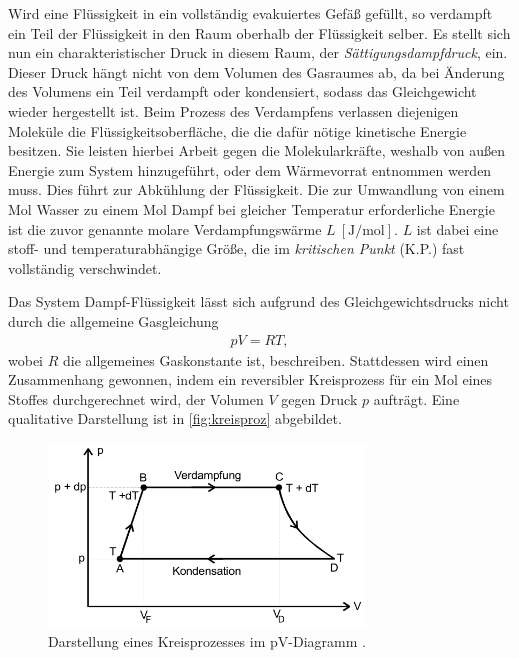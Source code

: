 \noindent
Wird eine Flüssigkeit in ein vollständig evakuiertes Gefäß gefüllt, so verdampft ein Teil der Flüssigkeit in den Raum oberhalb der Flüssigkeit
selber. Es stellt sich nun ein charakteristischer Druck in diesem Raum, der \textit{Sättigungsdampfdruck}, ein.
Dieser Druck hängt nicht von dem Volumen des Gasraumes ab, da bei Änderung des Volumens ein Teil verdampft oder kondensiert, sodass das
Gleichgewicht wieder hergestellt ist.
Beim Prozess des Verdampfens verlassen diejenigen Moleküle die Flüssigkeitsoberfläche, die die dafür nötige kinetische Energie besitzen.
Sie leisten hierbei Arbeit gegen die Molekularkräfte, weshalb von außen Energie zum System hinzugeführt, oder dem Wärmevorrat entnommen werden
muss. Dies führt zur Abkühlung der Flüssigkeit. Die zur Umwandlung von einem Mol Wasser zu einem Mol Dampf bei gleicher Temperatur 
erforderliche Energie ist die zuvor genannte molare Verdampfungswärme $L \: [\si{\joule\per\mol}]$.
$L$ ist dabei eine stoff- und temperaturabhängige Größe, die im \textit{kritischen Punkt} (K.P.) fast vollständig verschwindet.



\noindent
Das System Dampf-Flüssigkeit lässt sich aufgrund des Gleichgewichtsdrucks nicht durch die allgemeine Gasgleichung 
\begin{align}
    \label{eqn:gasgl}
    pV = RT,
\end{align}
wobei $R$ die allgemeines Gaskonstante ist, beschreiben. Stattdessen wird einen Zusammenhang gewonnen, indem ein reversibler Kreisprozess
für ein Mol eines Stoffes durchgerechnet wird, der Volumen $V$ gegen Druck $p$ aufträgt. 
Eine qualitative Darstellung ist in \autoref{fig:kreisproz} abgebildet.

\begin{figure}[H]
    \centering
    \includegraphics[width=0.75\textwidth]{daten/Dampfdruckkurve.png}
    \caption{Darstellung eines Kreisprozesses im pV-Diagramm \cite{anleitung}.}
    \label{fig:kreisproz}
\end{figure}

